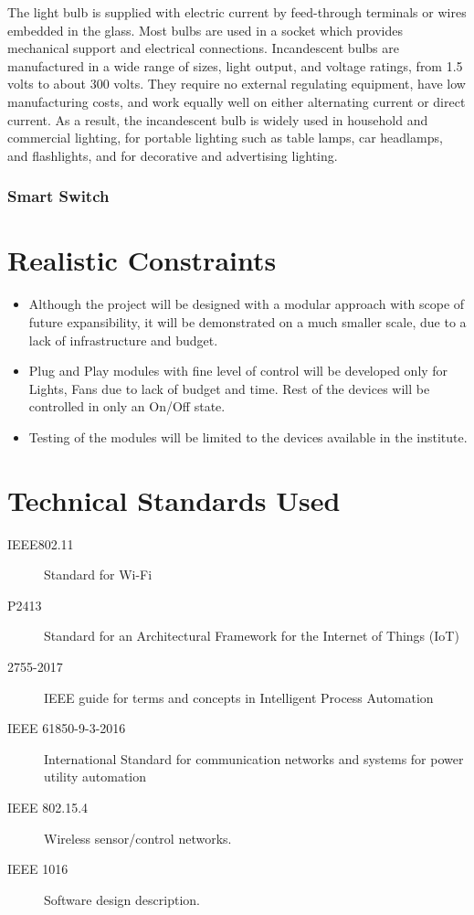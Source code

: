 The light bulb is supplied with electric current by feed-through terminals or wires embedded in the glass. Most bulbs are used in a socket which provides mechanical support and electrical connections. Incandescent bulbs are manufactured in a wide range of sizes, light output, and voltage ratings, from 1.5 volts to about 300 volts. They require no external regulating equipment, have low manufacturing costs, and work equally well on either alternating current or direct current. As a result, the incandescent bulb is widely used in household and commercial lighting, for portable lighting such as table lamps, car headlamps, and flashlights, and for decorative and advertising lighting.

\subsubsection*{Smart Switch}

        \section{Realistic Constraints}
        \begin{itemize}
      \item  Although the project will be designed with a modular approach with scope of future expansibility, it will be demonstrated on a much smaller scale, due to a lack of infrastructure and budget.

		\item Plug and Play modules with fine level of control will be developed only for Lights, Fans due to lack of budget and time. Rest of the devices will be controlled in only an On/Off state.
		
		\item Testing of the modules will be limited to the devices available in the institute.
        \end{itemize}
        
        
        
        \section{Technical Standards Used}
        \begin{description}
        	\item[IEEE802.11] Standard for Wi-Fi
        	\item[P2413] Standard for an Architectural Framework for the Internet of Things (IoT)
        	\item[2755-2017]  IEEE guide for terms and concepts in Intelligent Process Automation
\item[IEEE 61850-9-3-2016] International Standard for communication networks and systems for power utility automation
\item[IEEE 802.15.4] Wireless sensor/control networks.
\item[IEEE 1016] Software design description.

        \end{description}
